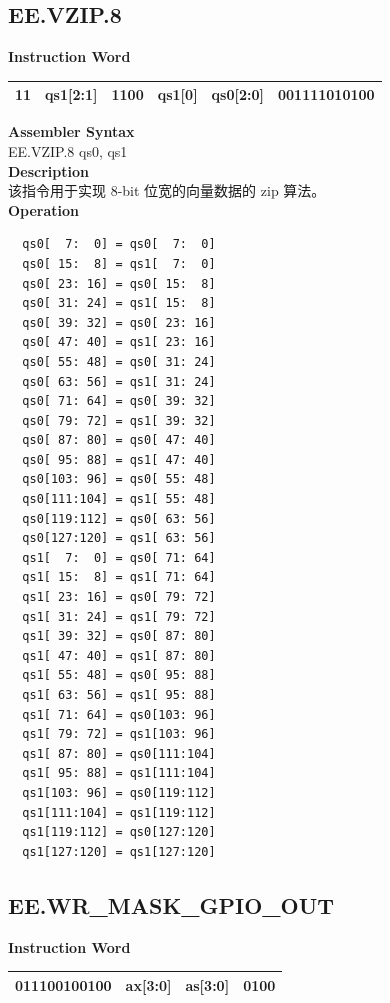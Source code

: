 \clearpage
\subsection{EE.VZIP.8}\label{instruction:EEVZIP8}
\setlength\tabcolsep{6pt}
\textbf{Instruction Word} \\
\begin{tabular}{|c|c|c|c|c|c|}
	\hline
	11 & qs1[2:1] & 1100 & qs1[0] & qs0[2:0] & 001111010100 \\
	\hline
\end{tabular}

\textbf{Assembler Syntax} \\
EE.VZIP.8 qs0, qs1 \\
\textbf{Description} \\
该指令用于实现 8-bit 位宽的向量数据的 zip 算法。\\
\textbf{Operation}
\begin{lstlisting}
  qs0[  7:  0] = qs0[  7:  0]
  qs0[ 15:  8] = qs1[  7:  0]
  qs0[ 23: 16] = qs0[ 15:  8]
  qs0[ 31: 24] = qs1[ 15:  8]
  qs0[ 39: 32] = qs0[ 23: 16]
  qs0[ 47: 40] = qs1[ 23: 16]
  qs0[ 55: 48] = qs0[ 31: 24]
  qs0[ 63: 56] = qs1[ 31: 24]
  qs0[ 71: 64] = qs0[ 39: 32]
  qs0[ 79: 72] = qs1[ 39: 32]
  qs0[ 87: 80] = qs0[ 47: 40]
  qs0[ 95: 88] = qs1[ 47: 40]
  qs0[103: 96] = qs0[ 55: 48]
  qs0[111:104] = qs1[ 55: 48]
  qs0[119:112] = qs0[ 63: 56]
  qs0[127:120] = qs1[ 63: 56]
  qs1[  7:  0] = qs0[ 71: 64]
  qs1[ 15:  8] = qs1[ 71: 64]
  qs1[ 23: 16] = qs0[ 79: 72]
  qs1[ 31: 24] = qs1[ 79: 72]
  qs1[ 39: 32] = qs0[ 87: 80]
  qs1[ 47: 40] = qs1[ 87: 80]
  qs1[ 55: 48] = qs0[ 95: 88]
  qs1[ 63: 56] = qs1[ 95: 88]
  qs1[ 71: 64] = qs0[103: 96]
  qs1[ 79: 72] = qs1[103: 96]
  qs1[ 87: 80] = qs0[111:104]
  qs1[ 95: 88] = qs1[111:104]
  qs1[103: 96] = qs0[119:112]
  qs1[111:104] = qs1[119:112]
  qs1[119:112] = qs0[127:120]
  qs1[127:120] = qs1[127:120]
\end{lstlisting}

\clearpage
\subsection{EE.WR\_MASK\_GPIO\_OUT}\label{instruction:EEWRMASKGPIOOUT}
\setlength\tabcolsep{6pt}
\textbf{Instruction Word} \\
\begin{tabular}{|c|c|c|c|}
	\hline
	011100100100 & ax[3:0] & as[3:0] & 0100 \\
	\hline
\end{tabular}


